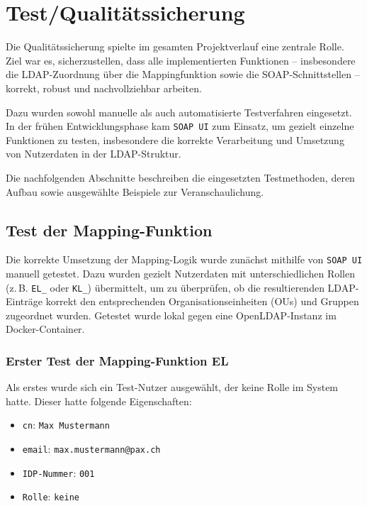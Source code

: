 \chapter{Test/Qualitätssicherung}
\vspace{-3em}

Die Qualitätssicherung spielte im gesamten Projektverlauf eine zentrale Rolle. Ziel war es, sicherzustellen, dass alle implementierten Funktionen – insbesondere die LDAP-Zuordnung über die Mappingfunktion sowie die SOAP-Schnittstellen – korrekt, robust und nachvollziehbar arbeiten. 

Dazu wurden sowohl manuelle als auch automatisierte Testverfahren eingesetzt. In der frühen Entwicklungsphase kam \texttt{SOAP UI} zum Einsatz, um gezielt einzelne Funktionen zu testen, insbesondere die korrekte Verarbeitung und Umsetzung von Nutzerdaten in der LDAP-Struktur. 

Die nachfolgenden Abschnitte beschreiben die eingesetzten Testmethoden, deren Aufbau sowie ausgewählte Beispiele zur Veranschaulichung.


\section{Test der Mapping-Funktion}
Die korrekte Umsetzung der Mapping-Logik wurde zunächst mithilfe von \texttt{SOAP UI} manuell getestet. Dazu wurden gezielt Nutzerdaten mit unterschiedlichen Rollen (z.\,B. \texttt{EL\_} oder \texttt{KL\_}) übermittelt, um zu überprüfen, ob die resultierenden LDAP-Einträge korrekt den entsprechenden Organisationseinheiten (OUs) und Gruppen zugeordnet wurden. Getestet wurde lokal gegen eine OpenLDAP-Instanz im Docker-Container.

\subsection{Erster Test der Mapping-Funktion EL}
Als erstes wurde sich ein Test-Nutzer ausgewählt, der keine Rolle im System hatte. Dieser hatte folgende Eigenschaften:
\begin{itemize}
    \item \texttt{cn}: \texttt{Max Mustermann}
    \item \texttt{email}: \texttt{max.mustermann@pax.ch}
    \item \texttt{IDP-Nummer}: \texttt{001}
    \item \texttt{Rolle}: \texttt{keine}
\end{itemize}

